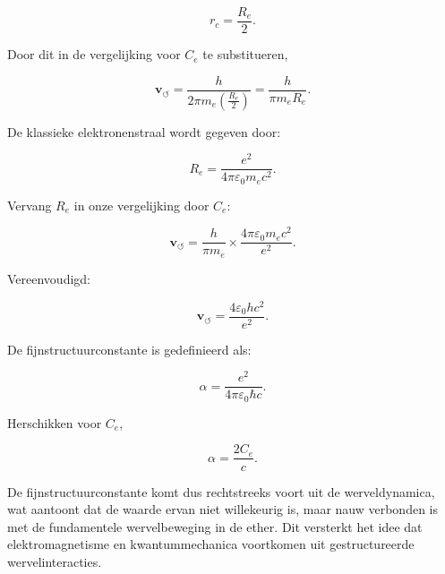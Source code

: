 \begin{equation}
r_c = \frac{R_e}{2}. \end{equation}

Door dit in de vergelijking voor $C_e$ te substitueren,

\begin{equation}
\mathbf{v}_{\scriptscriptstyle\boldsymbol{\circlearrowleft}} = \frac{h}{2 \pi m_e \left(\frac{R_e}{2}\right)} = \frac{h}{\pi m_e R_e}.
\end{equation}

De klassieke elektronenstraal wordt gegeven door:

\begin{equation}
R_e = \frac{e^2}{4 \pi \varepsilon_0 m_e c^2}. \end{equation}

Vervang $R_e$ in onze vergelijking door $C_e$:

\begin{equation}
\mathbf{v}_{\scriptscriptstyle\boldsymbol{\circlearrowleft}} = \frac{h}{\pi m_e} \times \frac{4 \pi \varepsilon_0 m_e c^2}{e^2}.
\end{equation}

Vereenvoudigd:

\begin{equation}
\mathbf{v}_{\scriptscriptstyle\boldsymbol{\circlearrowleft}} = \frac{4 \varepsilon_0 h c^2}{e^2}.
\end{equation}

De fijnstructuurconstante is gedefinieerd als:

\begin{equation}
\alpha = \frac{e^2}{4 \pi \varepsilon_0 \hbar c}. \end{equation}

Herschikken voor $C_e$,

\begin{equation}
\alpha = \frac{2 C_e}{c}.
\end{equation}

De fijnstructuurconstante komt dus rechtstreeks voort uit de werveldynamica, wat aantoont dat de waarde ervan niet willekeurig is, maar nauw verbonden is met de fundamentele wervelbeweging in de ether. Dit versterkt het idee dat elektromagnetisme en kwantummechanica voortkomen uit gestructureerde wervelinteracties.